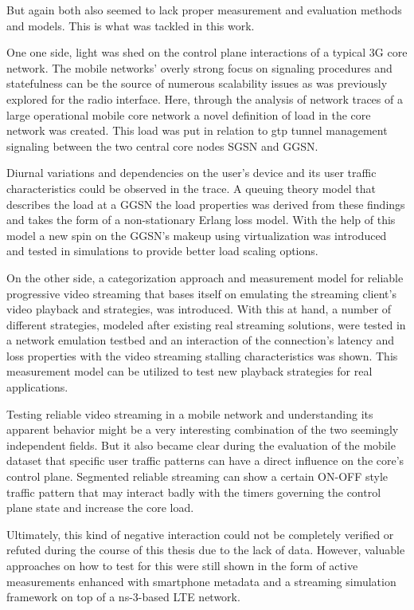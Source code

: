 But again both also seemed to lack proper measurement and evaluation methods and models. This is what was tackled in this work.

One one side, light was shed on the control plane interactions of a typical \gls{3G} core network. The mobile networks' overly strong focus on signaling procedures and statefulness can be the source of numerous scalability issues as was previously explored for the radio interface. Here, through the analysis of network traces of a large operational mobile core network a novel definition of load in the core network was created. This load was put in relation to \gls{gtp} tunnel management signaling between the two central core nodes \gls{SGSN} and \gls{GGSN}. 

Diurnal variations and dependencies on the user's device and its user traffic characteristics could be observed in the trace. A queuing theory model that describes the load at a \gls{GGSN} the load properties was derived from these findings and takes the form of a non-stationary Erlang loss model. With the help of this model a new spin on the \gls{GGSN}'s makeup using virtualization was introduced and tested in simulations to provide better load scaling options.

On the other side, a categorization approach and measurement model for reliable progressive video streaming that bases itself on emulating the streaming client's video playback and strategies, was introduced. With this at hand, a number of different strategies, modeled after existing real streaming solutions, were tested in a network emulation testbed and an interaction of the connection's latency and loss properties with the video streaming stalling characteristics was shown. This measurement model can be utilized to test new playback strategies for real applications.

Testing reliable video streaming in a mobile network and understanding its apparent behavior might be a very interesting combination of the two seemingly independent fields. But it also became clear during the evaluation of the mobile dataset that specific user traffic patterns can have a direct influence on the core's control plane. Segmented reliable streaming can show a certain ON-OFF style traffic pattern that may interact badly with the timers governing the control plane state and increase the core load.

Ultimately, this kind of negative interaction could not be completely verified or refuted during the course of this thesis due to the lack of data. However, valuable approaches on how to test for this were still shown in the form of active measurements enhanced with smartphone metadata and a streaming simulation framework on top of a ns-3-based \gls{LTE} network.

